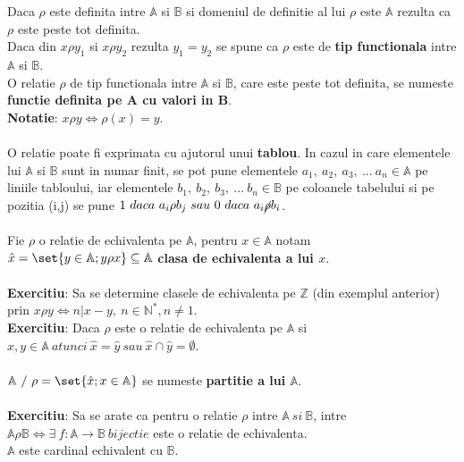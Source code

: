 \documentclass{article}
\newcommand{\A}{\mathbb A}
\newcommand{\B}{\mathbb B}
\newcommand{\Z}{\mathbb Z}
\newcommand{\Npos}{\mathbb{N}^{*}}
\begin{document}
    Daca $\rho$ este definita intre $\A$ si $\B$ si domeniul de definitie al lui $\rho$ este $\A$ rezulta ca $\rho$ este peste tot definita. \\
    Daca din $x \rho y_1$ si $x \rho y_2$ rezulta $y_1 = y_2$ se spune ca $\rho$ este de \textbf{tip functionala} intre $\A$ si $\B$.\\
    O relatie $\rho$ de tip functionala intre $\A$ si $\B$, care este peste tot definita, se numeste \textbf{functie definita pe A cu valori in B}.\\
    \textbf{Notatie}: $x \rho y \iff \rho(x) = y$.\\ \\
    O relatie poate fi exprimata cu ajutorul unui \textbf{tablou}. In cazul in care elementele lui $\A$ si $\B$ sunt in numar finit, se pot pune elementele $a_1,\ a_2,\ a_3,\ ...\ a_n \in \A$ pe liniile tabloului, iar elementele $b_1,\ b_2,\ b_3,\ ...\ b_n \in \B$ pe coloanele tabelului si pe pozitia (i,j) se pune $1\ daca\ a_i \rho b_j\ sau\ 0\ daca\ a_i \cancel{\rho} b_i$.\\ \\
    Fie $\rho$ o relatie de echivalenta pe $\A$, pentru $x \in \A$ notam $\hat{x} = \set{y \in \A; y \rho x} \subseteq \A$ \textbf{clasa de echivalenta a lui $x$}.\\ \\
    \textbf{Exercitiu}: Sa se determine clasele de echivalenta pe $\Z$ (din exemplul anterior) prin $x \rho y \iff n | x-y,\ n \in \Npos, n \neq 1$. \\
    \textbf{Exercitiu}: Daca $\rho$ este o relatie de echivalenta pe $\A$ si $x,y \in \A\ atunci\ \hat{x} = \hat{y}\ sau\ \hat{x} \cap \hat{y} = \emptyset$. \\ \\
    $\A\ /\ \rho = \set{\hat{x}; x \in \A}$ se numeste \textbf{partitie a lui $\A$}.\\ \\
    \textbf{Exercitiu}: Sa se arate ca pentru o relatie $\rho$ intre $\A\ si\ \B$, intre \\ $\A \rho \B \iff \exists\ f:\A \rightarrow \B\ bijectie$ este o relatie de echivalenta.\\
    $\A$ este cardinal echivalent cu $\B$.
    
\end{document}
